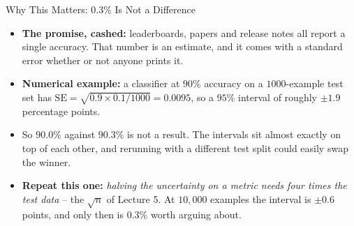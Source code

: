 \begin{frame}{Why This Matters: $0.3\%$ Is Not a Difference}
\begin{itemize}
  \item \textbf{The promise, cashed:} leaderboards, papers and release notes all report a single accuracy. That number is an estimate, and it comes with a standard error whether or not anyone prints it.
  \pause
  \item \textbf{Numerical example:} a classifier at $90\%$ accuracy on a $1000$-example test set has $\mathrm{SE} = \sqrt{0.9 \times 0.1 / 1000} = 0.0095$, so a $95\%$ interval of roughly $\pm 1.9$ percentage points.
  \pause
  \item So $90.0\%$ against $90.3\%$ is not a result. The intervals sit almost exactly on top of each other, and rerunning with a different test split could easily swap the winner.
  \pause
  \item \textbf{Repeat this one:} \emph{halving the uncertainty on a metric needs four times the test data} -- the $\sqrt{n}$ of Lecture 5. At $10{,}000$ examples the interval is $\pm 0.6$ points, and only then is $0.3\%$ worth arguing about.
\end{itemize}
\end{frame}
